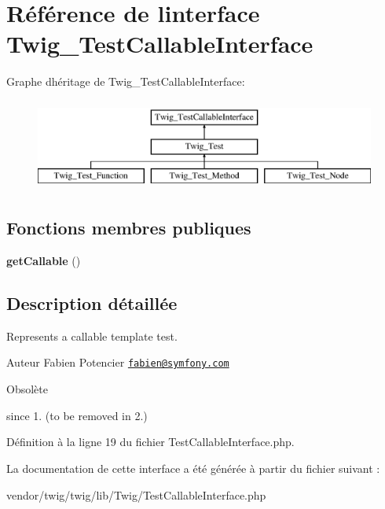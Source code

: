 \hypertarget{interface_twig___test_callable_interface}{}\section{Référence de l\textquotesingle{}interface Twig\+\_\+\+Test\+Callable\+Interface}
\label{interface_twig___test_callable_interface}
Graphe d\textquotesingle{}héritage de Twig\+\_\+\+Test\+Callable\+Interface\+:\begin{figure}[H]
\begin{center}
\leavevmode
\includegraphics[height=3.000000cm]{interface_twig___test_callable_interface}
\end{center}
\end{figure}
\subsection*{Fonctions membres publiques}
\begin{DoxyCompactItemize}
\item 
{\bfseries get\+Callable} ()\hypertarget{interface_twig___test_callable_interface_a0be839e0782a38a172c386bd963375c9}{}\label{interface_twig___test_callable_interface_a0be839e0782a38a172c386bd963375c9}

\end{DoxyCompactItemize}


\subsection{Description détaillée}
Represents a callable template test.

\begin{DoxyAuthor}{Auteur}
Fabien Potencier \href{mailto:fabien@symfony.com}{\tt fabien@symfony.\+com}
\end{DoxyAuthor}
\begin{DoxyRefDesc}{Obsolète}
\item[\hyperlink{deprecated__deprecated000041}{Obsolète}]since 1. (to be removed in 2.) \end{DoxyRefDesc}


Définition à la ligne 19 du fichier Test\+Callable\+Interface.\+php.



La documentation de cette interface a été générée à partir du fichier suivant \+:\begin{DoxyCompactItemize}
\item 
vendor/twig/twig/lib/\+Twig/Test\+Callable\+Interface.\+php\end{DoxyCompactItemize}
